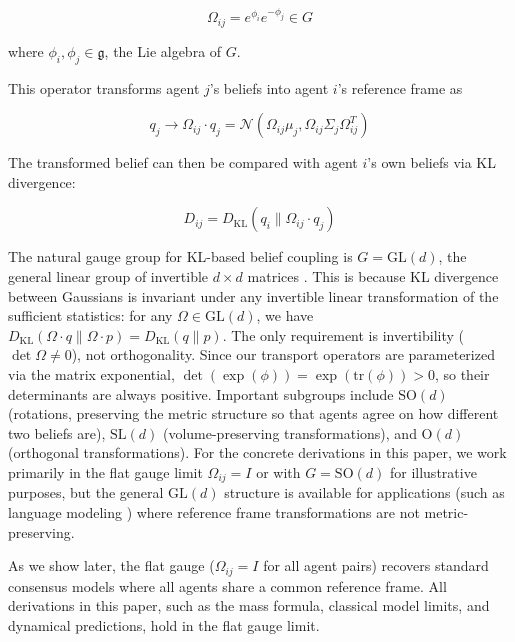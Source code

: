 \documentclass[12pt]{article}
\begin{document}
\begin{equation}
\Omega_{ij} = e^{\phi_i}e^{-\phi_j} \in G
\end{equation}

where $\phi_i, \phi_j \in \mathfrak{g}$, the Lie algebra of $G$.

This operator transforms agent $j$'s beliefs into agent $i$'s reference frame as

\begin{equation}
q_j \to \Omega_{ij} \cdot q_j = \mathcal{N}(\Omega_{ij}\mu_j, \Omega_{ij}\Sigma_j\Omega_{ij}^T)
\end{equation}

The transformed belief can then be compared with agent $i$'s own beliefs via KL divergence:

\begin{equation}
D_{ij} = D_{\mathrm{KL}}(q_i \| \Omega_{ij} \cdot q_j)
\end{equation}

The natural gauge group for KL-based belief coupling is $G = \mathrm{GL}(d)$, the general linear group of invertible $d \times d$ matrices \citep{Dennis2025}. This is because KL divergence between Gaussians is invariant under any invertible linear transformation of the sufficient statistics: for any $\Omega \in \mathrm{GL}(d)$, we have $D_{\mathrm{KL}}(\Omega \cdot q \| \Omega \cdot p) = D_{\mathrm{KL}}(q \| p)$. The only requirement is invertibility ($\det \Omega \neq 0$), not orthogonality. Since our transport operators are parameterized via the matrix exponential, $\det(\exp(\phi)) = \exp(\mathrm{tr}(\phi)) > 0$, so their determinants are always positive. Important subgroups include $\mathrm{SO}(d)$ (rotations, preserving the metric structure so that agents agree on how different two beliefs are), $\mathrm{SL}(d)$ (volume-preserving transformations), and $\mathrm{O}(d)$ (orthogonal transformations). For the concrete derivations in this paper, we work primarily in the flat gauge limit $\Omega_{ij} = I$ or with $G = \mathrm{SO}(d)$ for illustrative purposes, but the general $\mathrm{GL}(d)$ structure is available for applications (such as language modeling \citep{Dennis2025}) where reference frame transformations are not metric-preserving.

As we show later, the flat gauge ($\Omega_{ij} = I$ for all agent pairs) recovers standard consensus models where all agents share a common reference frame. All derivations in this paper, such as the mass formula, classical model limits, and dynamical predictions, hold in the flat gauge limit.
\end{document}
